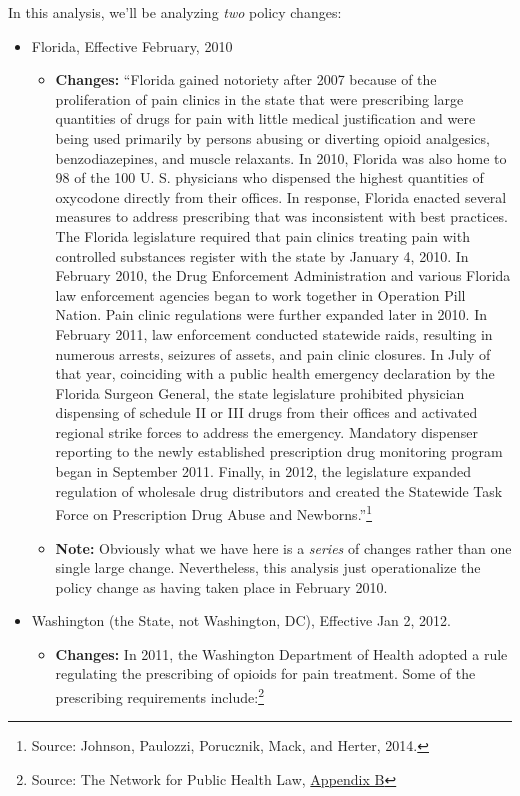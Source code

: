 \documentclass[12pt]{article}
\begin{document}
In this analysis, we'll be analyzing \emph{two} policy changes:

\begin{itemize}

\item Florida, Effective February, 2010
\begin{itemize}
  \item \textbf{Changes:} ``Florida gained notoriety after 2007 because of the proliferation of pain clinics in the state that were prescribing large quantities of drugs for pain with little medical justification and were being used primarily by persons abusing or diverting opioid analgesics, benzodiazepines, and muscle relaxants. In 2010, Florida was also home to 98 of the 100 U. S. physicians who dispensed the highest quantities of oxycodone directly from their offices. In response, Florida enacted several measures to address prescribing that was inconsistent with best practices. The Florida legislature required that pain clinics treating pain with controlled substances register with the state by January 4, 2010. In February 2010, the Drug Enforcement Administration and various Florida law enforcement agencies began to work together in Operation Pill Nation. Pain clinic regulations were further expanded later in 2010. In February 2011, law enforcement conducted statewide raids, resulting in numerous arrests, seizures of assets, and pain clinic closures. In July of that year, coinciding with a public health emergency declaration by the Florida Surgeon General, the state legislature prohibited physician dispensing of schedule II or III drugs from their offices and activated regional strike forces to address the emergency. Mandatory dispenser reporting to the newly established prescription drug monitoring program began in September 2011. Finally, in 2012, the legislature expanded regulation of wholesale drug distributors and created the Statewide Task Force on Prescription Drug Abuse and Newborns.''\footnote{Source: Johnson, Paulozzi, Porucznik, Mack, and Herter, 2014.}
  \item \textbf{Note:} Obviously what we have here is a \emph{series} of changes rather than one single large change. Nevertheless, this analysis just operationalize the policy change as having taken place in February 2010.
\end{itemize}
  \item Washington (the State, not Washington, DC), Effective Jan 2, 2012.
  \begin{itemize}
    \item \textbf{Changes:} In 2011, the Washington Department of Health adopted a rule regulating the prescribing of opioids for pain treatment. Some of the prescribing requirements include:\footnote{Source: The Network for Public Health Law, \href{https://azdhs.gov/documents/prevention/womens-childrens-health/injury-prevention/opioid-prevention/appendix-b-state-by-state-summary.pdf}{Appendix B}}

\end{itemize}
\end{itemize}
\end{document}
